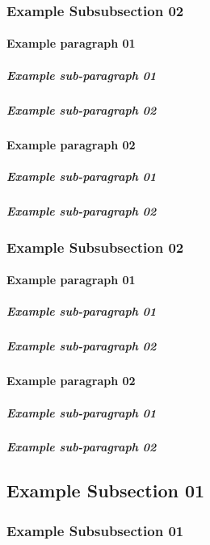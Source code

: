 \documentclass[letterpaper, 11pt]{article}
\newcounter{subsubparagraph}
\begin{document}
		\subsubsection{Example Subsubsection 02}
			\paragraph{Example paragraph 01}
				\subparagraph{Example sub-paragraph 01}
				\subparagraph{Example sub-paragraph 02}
			\paragraph{Example paragraph 02}
				\subparagraph{Example sub-paragraph 01}
				\subparagraph{Example sub-paragraph 02}
		\subsubsection{Example Subsubsection 02}
			\paragraph{Example paragraph 01}
				\subparagraph{Example sub-paragraph 01}
				\subparagraph{Example sub-paragraph 02}
			\paragraph{Example paragraph 02}
				\subparagraph{Example sub-paragraph 01}
				\subparagraph{Example sub-paragraph 02}
	\subsection{Example Subsection 01}
		\subsubsection{Example Subsubsection 01}
\end{document}

